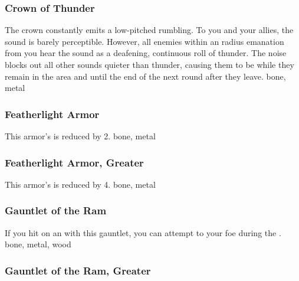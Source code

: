 \hypertarget{item:Crown of Thunder}{\subsubsection{Crown of Thunder\hfill{}}}
The crown constantly emits a low-pitched rumbling.
To you and your allies, the sound is barely perceptible.
However, all enemies within an \arealarge radius emanation from you hear the sound as a deafening, continuous roll of thunder.
The noise blocks out all other sounds quieter than thunder, causing them to be \deafened while they remain in the area and until the end of the next round after they leave.
 
 bone, metal
\lowercase{\hypertarget{item:Featherlight Armor}{}}\label{item:Featherlight Armor}
\hypertarget{item:Featherlight Armor}{\subsubsection{Featherlight Armor\hfill{}}}
This armor's  is reduced by 2.
 
 bone, metal
\lowercase{\hypertarget{item:Featherlight Armor, Greater}{}}\label{item:Featherlight Armor, Greater}
\hypertarget{item:Featherlight Armor, Greater}{\subsubsection{Featherlight Armor, Greater\hfill{}}}
This armor's  is reduced by 4.
 
 bone, metal
\lowercase{\hypertarget{item:Gauntlet of the Ram}{}}\label{item:Gauntlet of the Ram}
\hypertarget{item:Gauntlet of the Ram}{\subsubsection{Gauntlet of the Ram\hfill{}}}
If you hit on an   with this gauntlet, you can attempt to  your foe during the .
 
 bone, metal, wood
\lowercase{\hypertarget{item:Gauntlet of the Ram, Greater}{}}\label{item:Gauntlet of the Ram, Greater}
\hypertarget{item:Gauntlet of the Ram, Greater}{\subsubsection{Gauntlet of the Ram, Greater\hfill{}}}
